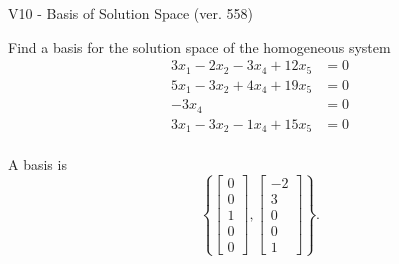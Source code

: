 \begin{exercise}
  \begin{exerciseTitle}V10 - Basis of Solution Space (ver. 558)\end{exerciseTitle}
  \begin{exerciseStatement}
    Find a basis for the solution space of the homogeneous system 
\begin{align*}
 3 x_ 1 -2 x_ 2 -3 x_ 4 + 12 x_ 5 &= 0  \\ 
  5 x_ 1 -3 x_ 2 + 4 x_ 4 + 19 x_ 5 &= 0  \\ 
  -3 x_ 4 &= 0  \\ 
  3 x_ 1 -3 x_ 2 -1 x_ 4 + 15 x_ 5 &= 0  \\ 
 \end{align*}


 
  \end{exerciseStatement}

  \begin{exerciseAnswer}
   A basis is   
\[\left\{\left[\begin{array}{c}
0 \\
0 \\
1 \\
0 \\
0
\end{array}\right] , \left[\begin{array}{c}
-2 \\
3 \\
0 \\
0 \\
1
\end{array}\right]\right\}.\]

  


  \end{exerciseAnswer}
\end{exercise}